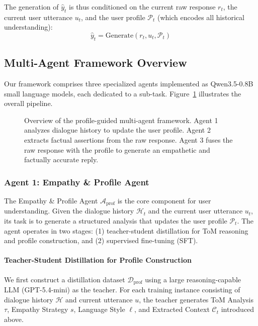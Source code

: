 \documentclass[11pt]{article}
\begin{document}
The generation of $\hat{y}_t$ is thus conditioned on the current raw response $r_t$, the current user utterance $u_t$, and the user profile $\mathcal{P}_t$ (which encodes all historical understanding):
\begin{equation}
    \hat{y}_t = \text{Generate}(r_t, u_t, \mathcal{P}_t)
\end{equation}

\subsection{Multi-Agent Framework Overview}
\label{subsec:framework_overview}

Our framework comprises three specialized agents implemented as Qwen3.5-0.8B small language models, each dedicated to a sub-task. Figure~\ref{fig:architecture} illustrates the overall pipeline.

\begin{figure}[htbp]
\centering
\caption{Overview of the profile-guided multi-agent framework. Agent 1 analyzes dialogue history to update the user profile. Agent 2 extracts factual assertions from the raw response. Agent 3 fuses the raw response with the profile to generate an empathetic and factually accurate reply.}
\label{fig:architecture}
\end{figure}

\subsubsection{Agent 1: Empathy \& Profile Agent}
\label{subsec:agent_profile}

The Empathy \& Profile Agent $\mathcal{A}_{\text{prof}}$ is the core component for user understanding. Given the dialogue history $\mathcal{H}_t$ and the current user utterance $u_t$, its task is to generate a structured analysis that updates the user profile $\mathcal{P}_t$. The agent operates in two stages: (1) teacher-student distillation for ToM reasoning and profile construction, and (2) supervised fine-tuning (SFT).

\paragraph{Teacher-Student Distillation for Profile Construction}

We first construct a distillation dataset $\mathcal{D}_{\text{prof}}$ using a large reasoning-capable LLM (GPT-5.4-mini) as the teacher. For each training instance consisting of dialogue history $\mathcal{H}$ and current utterance $u$, the teacher generates ToM Analysis $\tau$, Empathy Strategy $s$, Language Style $\ell$, and Extracted Context $\mathcal{C}_t$ introduced above.
\end{document}
